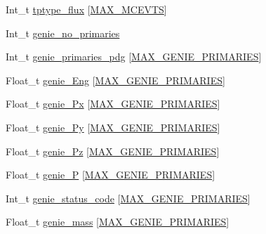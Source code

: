 \begin{DoxyCompactItemize}
\item 
Int\-\_\-t \hyperlink{classanatree_a4129cd59ebbe7e5112966e2ddcb52e4b}{tptype\-\_\-flux} \mbox{[}\hyperlink{anatree__core__v09410002__orig_8h_aaa5b2c5d6288820484963683ee7c31aa}{M\-A\-X\-\_\-\-M\-C\-E\-V\-T\-S}\mbox{]}
\item 
Int\-\_\-t \hyperlink{classanatree_aa01aa64ca4503514365663b0071e52c3}{genie\-\_\-no\-\_\-primaries}
\item 
Int\-\_\-t \hyperlink{classanatree_ac6f98b857e5f3e95719f0583c8481009}{genie\-\_\-primaries\-\_\-pdg} \mbox{[}\hyperlink{anatree__core__v09410002__orig_8h_a2b21972a7445ecb7aae4c92a9c5ae1fa}{M\-A\-X\-\_\-\-G\-E\-N\-I\-E\-\_\-\-P\-R\-I\-M\-A\-R\-I\-E\-S}\mbox{]}
\item 
Float\-\_\-t \hyperlink{classanatree_af043b6371cd535eb566e58972a67220c}{genie\-\_\-\-Eng} \mbox{[}\hyperlink{anatree__core__v09410002__orig_8h_a2b21972a7445ecb7aae4c92a9c5ae1fa}{M\-A\-X\-\_\-\-G\-E\-N\-I\-E\-\_\-\-P\-R\-I\-M\-A\-R\-I\-E\-S}\mbox{]}
\item 
Float\-\_\-t \hyperlink{classanatree_a4c2d04071d505e355abbf264e90b80ed}{genie\-\_\-\-Px} \mbox{[}\hyperlink{anatree__core__v09410002__orig_8h_a2b21972a7445ecb7aae4c92a9c5ae1fa}{M\-A\-X\-\_\-\-G\-E\-N\-I\-E\-\_\-\-P\-R\-I\-M\-A\-R\-I\-E\-S}\mbox{]}
\item 
Float\-\_\-t \hyperlink{classanatree_a7db2f195f7ff60b2e737772876b21bb4}{genie\-\_\-\-Py} \mbox{[}\hyperlink{anatree__core__v09410002__orig_8h_a2b21972a7445ecb7aae4c92a9c5ae1fa}{M\-A\-X\-\_\-\-G\-E\-N\-I\-E\-\_\-\-P\-R\-I\-M\-A\-R\-I\-E\-S}\mbox{]}
\item 
Float\-\_\-t \hyperlink{classanatree_a837cf311f13dab7b64c8c0975d8a7527}{genie\-\_\-\-Pz} \mbox{[}\hyperlink{anatree__core__v09410002__orig_8h_a2b21972a7445ecb7aae4c92a9c5ae1fa}{M\-A\-X\-\_\-\-G\-E\-N\-I\-E\-\_\-\-P\-R\-I\-M\-A\-R\-I\-E\-S}\mbox{]}
\item 
Float\-\_\-t \hyperlink{classanatree_afc98530654f7ad28cdfb88b0b1abe529}{genie\-\_\-\-P} \mbox{[}\hyperlink{anatree__core__v09410002__orig_8h_a2b21972a7445ecb7aae4c92a9c5ae1fa}{M\-A\-X\-\_\-\-G\-E\-N\-I\-E\-\_\-\-P\-R\-I\-M\-A\-R\-I\-E\-S}\mbox{]}
\item 
Int\-\_\-t \hyperlink{classanatree_a54d585c52996ce1601987a431de66f30}{genie\-\_\-status\-\_\-code} \mbox{[}\hyperlink{anatree__core__v09410002__orig_8h_a2b21972a7445ecb7aae4c92a9c5ae1fa}{M\-A\-X\-\_\-\-G\-E\-N\-I\-E\-\_\-\-P\-R\-I\-M\-A\-R\-I\-E\-S}\mbox{]}
\item 
Float\-\_\-t \hyperlink{classanatree_a56a75507b65422e29d6eb10a30e27063}{genie\-\_\-mass} \mbox{[}\hyperlink{anatree__core__v09410002__orig_8h_a2b21972a7445ecb7aae4c92a9c5ae1fa}{M\-A\-X\-\_\-\-G\-E\-N\-I\-E\-\_\-\-P\-R\-I\-M\-A\-R\-I\-E\-S}\mbox{]}

\end{DoxyCompactItemize}
